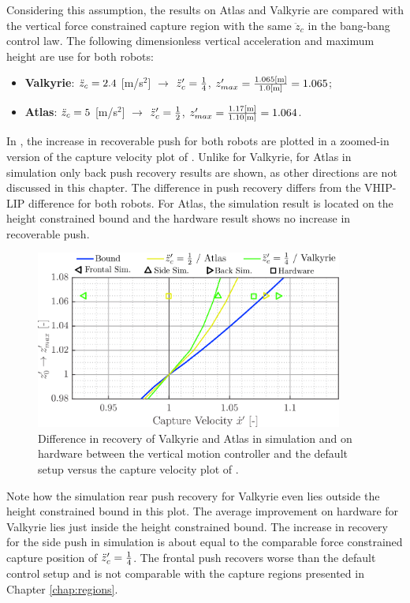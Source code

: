 Considering this assumption, the results on Atlas and Valkyrie are compared with the vertical force constrained capture region with the same $\ddot{z}_c$ in the bang-bang control law. The following dimensionless vertical acceleration and maximum height are use for both robots:
\begin{itemize}
	\item \textbf{Valkyrie}: $\ddot{z}_{c}=2.4$ [m/s$^2$] $\rightarrow$ $\ddot{z}_{c}'=\frac{1}{4}$, \quad $z_{max}' = \frac{1.065\text{[m]}}{1.0\text{[m]}}=1.065$;
	\item \textbf{Atlas}: $\ddot{z}_{c}=5$ [m/s$^2$] $\rightarrow$ $\ddot{z}_{c}'=\frac{1}{2}$, \quad $z_{max}' = \frac{1.17\text{[m]}}{1.10\text{[m]}}=1.064$.
\end{itemize}
In , the increase in recoverable push for both robots are plotted in a zoomed-in version of the capture velocity plot of . Unlike for Valkyrie, for Atlas in simulation only back push recovery results are shown, as other directions are not discussed in this chapter. The difference in push recovery differs from the \ac{VHIP}-\ac{LIP} difference for both robots. For Atlas, the simulation result is located on the height constrained bound and the hardware result shows no increase in recoverable push.
\begin{figure}
\centering
\includegraphics[width=0.9\textwidth]{STYLESTUFF/regioncomparison1.png}
\caption{Difference in recovery of Valkyrie and Atlas in simulation and on hardware between the vertical motion controller and the default setup versus the capture velocity plot of .}
\label{fig:regioncomparison}
\end{figure}

Note how the simulation rear push recovery for Valkyrie even lies outside the height constrained bound in this plot. The average improvement on hardware for Valkyrie lies just inside the height constrained bound. The increase in recovery for the side push in simulation is about equal to the comparable force constrained capture position of $\ddot{z}_{c}'=\frac{1}{4}$. The frontal push recovers worse than the default control setup and is not comparable with the capture regions presented in Chapter \ref{chap:regions}.

